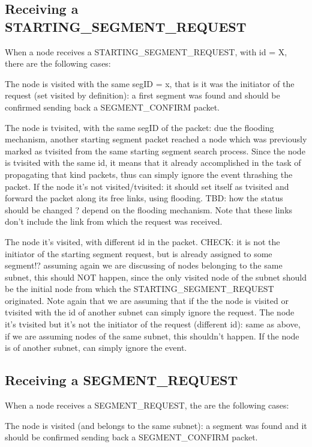 \documentclass[conference]{IEEEtran}
\begin{document}
\subsection{Receiving a STARTING\_SEGMENT\_REQUEST}

When a node receives a STARTING\_SEGMENT\_REQUEST, with id = X,  there
are the following cases:

The node is visited with the same segID = x, that is it was the
initiator of the request (set visited by definition): a first segment
was found and should be confirmed sending back a SEGMENT\_CONFIRM
packet.  

The node is tvisited, with the same segID of the packet: due
the flooding mechanism, another starting segment packet reached a node
which was previously marked as tvisited from the same starting segment
search process. Since the node is tvisited with the same id, it means
that it already accomplished in the task of propagating that kind
packets, thus can simply ignore the event thrashing the packet.  If
the node it's not visited/tvisited: it should set itself as tvisited
and forward the packet along its free links, using flooding. TBD: how
the status should be changed ? depend on the flooding mechanism. Note
that these links don’t include the link from which the request was
received.  

The node it's visited, with different id in the packet.
CHECK:  it is not the initiator of the starting segment request, but
is already assigned to some segment!? assuming again we are discussing
of nodes belonging to the same subnet, this should NOT happen, since
the only visited node of the subnet should be the initial node from
which the STARTING\_SEGMENT\_REQUEST originated. Note again that we are
assuming that if the the node is visited or tvisited with the id of
another subnet can simply ignore the request.  The node it's tvisited
but it's not the initiator of the request (different id): same as
above, if we are assuming nodes of the same subnet, this shouldn’t
happen. If the node is of another subnet, can simply ignore the event.

\subsection{Receiving a SEGMENT\_REQUEST}
When a node receives a SEGMENT\_REQUEST, the are the following cases:

The node is visited (and belongs to the same subnet): a segment was
found and it should be confirmed sending back a SEGMENT\_CONFIRM
packet.  
\end{document}
